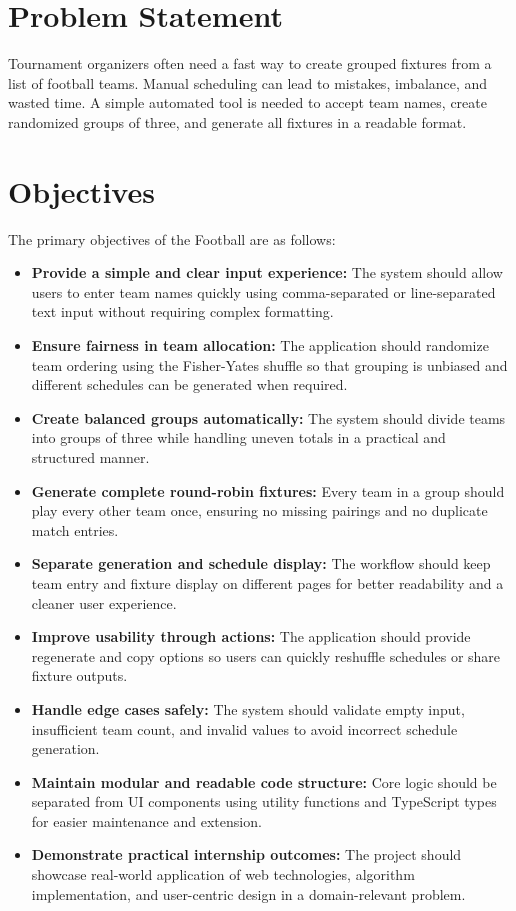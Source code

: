 \documentclass[12pt,a4paper]{report}
\begin{document}
\section{Problem Statement}
Tournament organizers often need a fast way to create grouped fixtures from a list of football teams. Manual scheduling can lead to mistakes, imbalance, and wasted time. A simple automated tool is needed to accept team names, create randomized groups of three, and generate all fixtures in a readable format.

\section{Objectives}
The primary objectives of the Football  are as follows:
\begin{itemize}
    \item \textbf{Provide a simple and clear input experience:} The system should allow users to enter team names quickly using comma-separated or line-separated text input without requiring complex formatting.

    \item \textbf{Ensure fairness in team allocation:} The application should randomize team ordering using the Fisher-Yates shuffle so that grouping is unbiased and different schedules can be generated when required.

    \item \textbf{Create balanced groups automatically:} The system should divide teams into groups of three while handling uneven totals in a practical and structured manner.

    \item \textbf{Generate complete round-robin fixtures:} Every team in a group should play every other team once, ensuring no missing pairings and no duplicate match entries.

    \item \textbf{Separate generation and schedule display:} The workflow should keep team entry and fixture display on different pages for better readability and a cleaner user experience.

    \item \textbf{Improve usability through actions:} The application should provide regenerate and copy options so users can quickly reshuffle schedules or share fixture outputs.

    \item \textbf{Handle edge cases safely:} The system should validate empty input, insufficient team count, and invalid values to avoid incorrect schedule generation.

    \item \textbf{Maintain modular and readable code structure:} Core logic should be separated from UI components using utility functions and TypeScript types for easier maintenance and extension.

    \item \textbf{Demonstrate practical internship outcomes:} The project should showcase real-world application of web technologies, algorithm implementation, and user-centric design in a domain-relevant problem.
\end{itemize}
\end{document}

